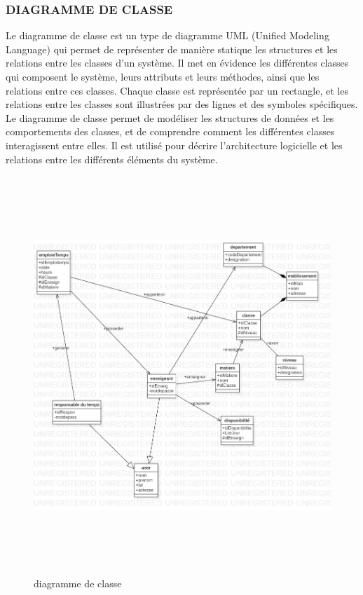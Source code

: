 \documentclass[english,12pt,a4paper]{report}
\begin{document}
\subsubsection{DIAGRAMME DE CLASSE}
Le diagramme de classe est un type de diagramme UML (Unified Modeling Language) qui permet de représenter de manière statique les structures et les relations entre les classes d'un système. Il met en évidence les différentes classes qui composent le système, leurs attributs et leurs méthodes, ainsi que les relations entre ces classes. Chaque classe est représentée par un rectangle, et les relations entre les classes sont illustrées par des lignes et des symboles spécifiques. Le diagramme de classe permet de modéliser les structures de données et les comportements des classes, et de comprendre comment les différentes classes interagissent entre elles. Il est utilisé pour décrire l'architecture logicielle et les relations entre les différents éléments du système.
\begin{figure}[h]
	\centering
	\includegraphics*[height=15cm, width=18cm]{newdiagrammeclasse.jpg}
	\caption{diagramme de classe}
	\label{fig10: diagramme de classe}
\end{figure}
 
\end{document}
